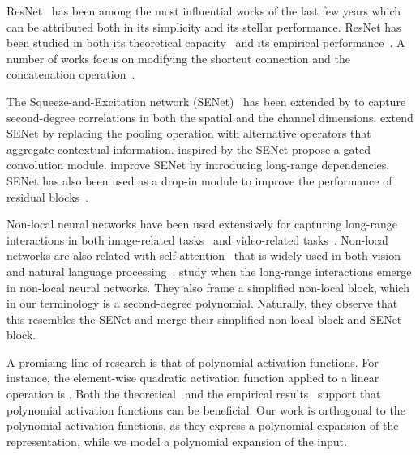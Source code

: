 \documentclass[runningheads]{llncs}
\newcommand{\resnet}{ResNet}
\newcommand{\sne}{SENet}
\providecommand{\citet}{\cite}
\begin{document}
 
\resnet~\cite{he2015deep} has been among the most influential works of the last few years which can be attributed both in its simplicity and its stellar performance. \resnet{} has been studied in both its theoretical capacity~\cite{hardt2016identity, balduzzi2017shattered, shamir2018resnets, zaeemzadeh2018norm} and its empirical performance~\cite{xie2017aggregated, szegedy2017inception, zagoruyko2016wide}.  A number of works focus on modifying the shortcut connection and the concatenation operation~\cite{huang2017densely, chen2017dual, wang2018mixed}. 

The Squeeze-and-Excitation network (\sne)~\cite{hu2018squeeze} has been extended by \citet{roy2018concurrent} to capture second-degree correlations in both the spatial and the channel dimensions. \cite{hu2018gather} extend \sne{} by replacing the pooling operation with alternative operators that aggregate contextual information. \citet{yang2020gated} inspired by the \sne{} propose a gated convolution module. \citet{ruan2020linear} improve \sne{} by introducing long-range dependencies. \sne{} has also been used as a drop-in module to improve the performance of residual blocks~\cite{gao2019res2net}. 



Non-local neural networks have been used extensively for capturing long-range interactions in both image-related tasks~\cite{li2020neural, zhu2019asymmetric, huang2019ccnet} and video-related tasks~\cite{chen20182, girdhar2019video}. Non-local networks are also related with self-attention~\cite{vaswani2017attention} that is widely used in both vision~\cite{parmar2019stand} and natural language processing~\cite{galassi2019attention, ma2019tensorized}. 
\citet{cao2019gcnet} study when the long-range interactions emerge in non-local neural networks. They also frame a simplified non-local block, which in our terminology is a second-degree polynomial. Naturally, they observe that this resembles the \sne{} and merge their simplified non-local block and \sne{} block. 



A promising line of research is that of polynomial activation functions. For instance, the element-wise quadratic activation function  applied to a linear operation  is . Both the theoretical~\cite{kileel2019expressive, livni2014computational} and the empirical results~\cite{ramachandran2017searching, lokhande2020generating} support that polynomial activation functions can be beneficial. Our work is orthogonal to the polynomial activation functions, as they express a polynomial expansion of the representation, while we model a polynomial expansion of the input.
\end{document}
